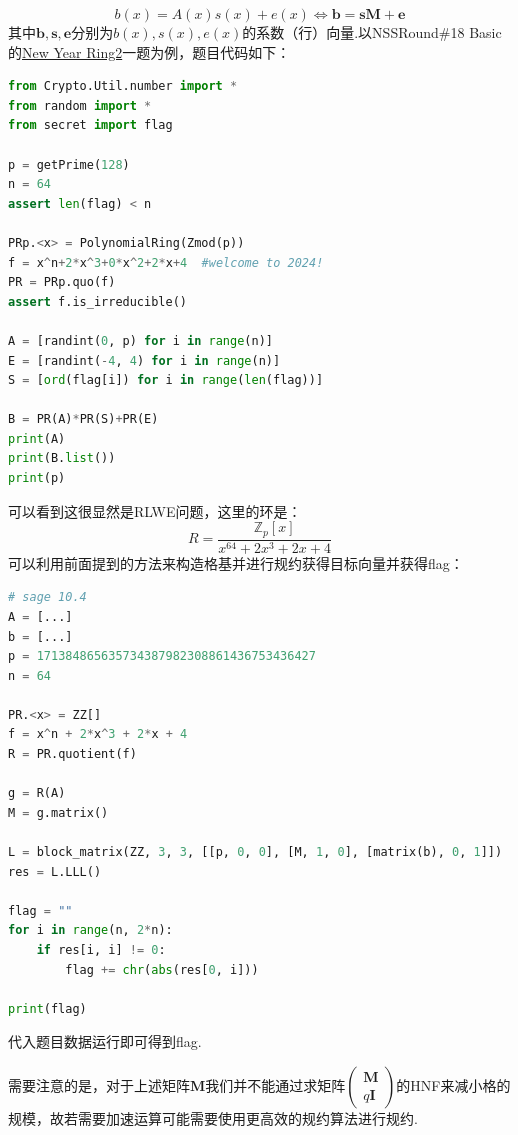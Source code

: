 \documentclass{book}
\numberwithin{equation}{subsubsection}
\begin{document}
\begin{equation}
    b(x)=A(x)s(x)+e(x)\Leftrightarrow\pmb{b}=\pmb{s}\pmb{M}+\pmb{e}
    \nonumber
\end{equation}
其中$\pmb{b},\pmb{s},\pmb{e}$分别为$b(x),s(x),e(x)$的系数（行）向量.以NSSRound\#18 Basic的\href{https://www.nssctf.cn/problem/5112}{New Year Ring2}一题为例，题目代码如下：
\begin{lstlisting}[language=Python,basicstyle=\ttfamily,breaklines=true,keywordstyle=\bfseries\color{blue}]
from Crypto.Util.number import *  
from random import *  
from secret import flag  
  
p = getPrime(128)  
n = 64  
assert len(flag) < n  
  
PRp.<x> = PolynomialRing(Zmod(p))  
f = x^n+2*x^3+0*x^2+2*x+4  #welcome to 2024!  
PR = PRp.quo(f)  
assert f.is_irreducible()  
  
A = [randint(0, p) for i in range(n)]  
E = [randint(-4, 4) for i in range(n)]  
S = [ord(flag[i]) for i in range(len(flag))]  
  
B = PR(A)*PR(S)+PR(E)  
print(A)  
print(B.list())  
print(p)  
\end{lstlisting}
可以看到这很显然是RLWE问题，这里的环是：
\begin{equation}
    R=\frac{\mathbb{Z}_p[x]}{x^{64}+2x^3+2x+4}
    \nonumber
\end{equation}
可以利用前面提到的方法来构造格基并进行规约获得目标向量并获得flag：
\begin{lstlisting}[language=Python,basicstyle=\ttfamily,breaklines=true,keywordstyle=\bfseries\color{blue}]
# sage 10.4
A = [...]
b = [...]
p = 171384865635734387982308861436753436427
n = 64

PR.<x> = ZZ[]
f = x^n + 2*x^3 + 2*x + 4
R = PR.quotient(f)

g = R(A)
M = g.matrix()

L = block_matrix(ZZ, 3, 3, [[p, 0, 0], [M, 1, 0], [matrix(b), 0, 1]])
res = L.LLL()

flag = ""
for i in range(n, 2*n):
    if res[i, i] != 0:
        flag += chr(abs(res[0, i]))

print(flag)
\end{lstlisting}
代入题目数据运行即可得到flag.\par
需要注意的是，对于上述矩阵$\pmb{M}$我们并不能通过求矩阵$\left(\begin{matrix}\pmb{M}\\q\pmb{I}\end{matrix}\right)$的HNF来减小格的规模，故若需要加速运算可能需要使用更高效的规约算法进行规约.
\end{document}
